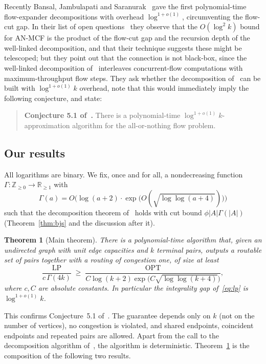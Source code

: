 \documentclass[11pt,letterpaper]{article}
\newtheorem{theorem}{Theorem}[section]
\theoremstyle{definition}
\newcommand{\LP}{\mathrm{LP}}
\newcommand{\OPT}{\mathrm{OPT}}
\newcommand{\R}{\mathbb{R}}
\newcommand{\Z}{\mathbb{Z}}
\begin{document}
Recently Bansal, Jambulapati and Saranurak~\cite{BJS26} gave the first polynomial-time
flow-expander decompositions with overhead $\log^{1+o(1)}$, circumventing the flow-cut gap. In
their list of open questions~\cite[Section~5]{BJS26} they observe that the $O(\log^2k)$ bound
for AN-MCF is the product of the flow-cut gap and the recursion depth of the well-linked
decomposition, and that their technique suggests these might be telescoped; but they point
out that the connection is not black-box, since the well-linked decomposition of~\cite{CKS05}
interleaves concurrent-flow computations with maximum-throughput flow steps. They ask whether
the decomposition of~\cite{CKS05} can be built with $\log^{1+o(1)}k$ overhead, note that this
would immediately imply the following conjecture, and state:

\begin{quote}
\textbf{Conjecture 5.1 of~\cite{BJS26}.} There is a polynomial-time $\log^{1+o(1)}k$-approximation
algorithm for the all-or-nothing flow problem.
\end{quote}

\subsection{Our results}

All logarithms are binary. We fix, once and for all, a nondecreasing function
$\Gamma:\Z_{\ge 0}\to\R_{\ge1}$ with
\begin{equation}\label{eq:gamma}
\Gamma(a)=O\bigl(\log(a+2)\cdot\exp\bigl(O(\sqrt{\log\log(a+4)})\bigr)\bigr)
\end{equation}
such that the decomposition theorem of~\cite{BJS26} holds with cut bound $\phi|A|\Gamma(|A|)$
(Theorem~\ref{thm:bjs} and the discussion after it).

\begin{theorem}[Main theorem]\label{thm:main}
There is a polynomial-time algorithm that, given an undirected graph with unit edge
capacities and $k$ terminal pairs, outputs a routable set of pairs together with a routing of
congestion one, of size at least
\[
\frac{\LP}{c\,\Gamma(4k)}\;\ge\;\frac{\OPT}{C\log(k+2)\exp\bigl(C\sqrt{\log\log (k+4)}\bigr)},
\]
where $c,C$ are absolute constants. In particular the integrality gap of~\eqref{eq:lp} is
$\log^{1+o(1)}k$.
\end{theorem}

This confirms Conjecture~5.1 of~\cite{BJS26}. The guarantee depends only on $k$ (not on the
number of vertices), no congestion is violated, and shared endpoints, coincident endpoints and
repeated pairs are allowed. Apart from the call to the decomposition algorithm of~\cite{BJS26},
the algorithm is deterministic. Theorem~\ref{thm:main} is the composition of the following two
results.
\end{document}
